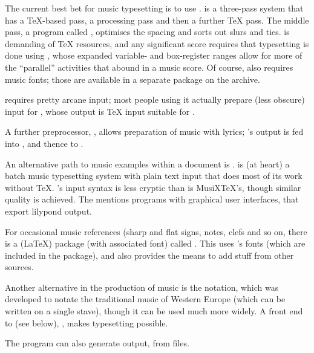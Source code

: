 
The current best bet for music typesetting is to use
.   is a three-pass system that
has a \TeX{}-based pass, a processing pass and then a further \TeX{}
pass.  The middle pass, a program called ,
optimises the spacing and sorts out slurs and ties.
 is demanding of \TeX{} resources, and any
significant score requires that typesetting is done using \eTeX{},
whose expanded variable- and box-register ranges allow for more of the
``parallel'' activities that abound in a music score.
Of course,  also requires music fonts; those are
available in a separate package on the archive.

 requires pretty arcane input; most people using it
actually prepare (less obscure) input for , whose output
is \TeX{} input suitable for .

A further preprocessor, , allows preparation of music
with lyrics; 's output is fed into , and
thence to .

An alternative path to music examples within a \alltex{} document is
\href{http://www.lilypond.org}{}.
 is (at heart) a batch music typesetting system
with plain text input that does most of its work without \TeX{}.
's input syntax is less cryptic than is
MusiX\TeX{}'s, though similar quality is achieved.  The
\href{http://lilypond.org/web/about/faq}{} mentions programs
with graphical user interfaces, that export lilypond output.

For occasional music references (sharp and flat signs, notes, clefs
and so on, there is a (\LaTeX{}) package (with associated font) called
.  This uses 's fonts (which
are included in the package), and also provides the means to add stuff
from other sources.

Another alternative in the production of music is the 
notation, which was developed to notate the traditional music of
Western Europe (which can be written on a single stave), though it can
be used much more widely.  A front end to  (see
below), , makes  typesetting possible.

The program  can also generate 
output, from  files.

